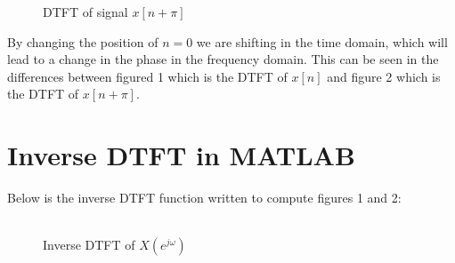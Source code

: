 \documentclass[a4paper,11pt]{article}
\begin{document}
\pagebreak
\begin{figure}[h]
 \begin{center}
  \caption{DTFT of signal $x[n + \pi]$}
 \end{center}
\end{figure}


By changing the position of $n=0$ we are shifting in the time domain, which will lead to a change in the phase in the frequency domain. This can be seen in the differences between figured 1 which is the DTFT of $x[n]$ and figure 2 which is the DTFT of $x[n+\pi]$.

\pagebreak
\section{Inverse DTFT in MATLAB}

Below is the inverse DTFT function written to compute figures 1 and 2:\\\\



\begin{figure}[h]
 \begin{center}
  \caption{Inverse DTFT of $X(e^{j\omega})$}
 \end{center}
\end{figure}
\end{document}
